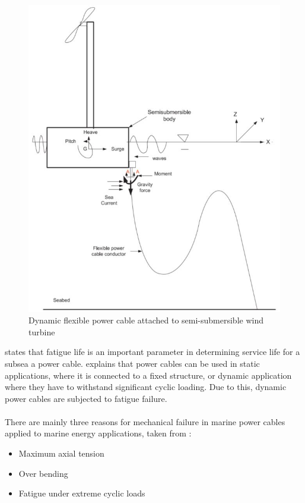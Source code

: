 \begin{figure}[H]
\centering
\includegraphics[scale=0.7]{figures/float}
\caption[$\; \:$Dynamic flexible power cable attached to semi-submersible wind turbine]{Dynamic flexible power cable attached to semi-submersible wind turbine \cite{Nasution2013}}
 \label{fig:float}
\end{figure}
\noindent \cite{YangShun-Han2017} states that fatigue life is an important parameter in determining service life for a subsea a power cable. \cite{Thies2012} explains that power cables can be used in static applications, where it is connected to a fixed structure, or dynamic application where they have to withstand significant cyclic loading. Due to this, dynamic power cables are subjected to fatigue failure.\\\\
There are mainly three reasons for mechanical failure in marine power cables applied to marine energy applications, taken from \cite{Thies2012} :

\begin{itemize}
    \item Maximum axial tension
    \item Over bending
    \item Fatigue under extreme cyclic loads
\end{itemize}

